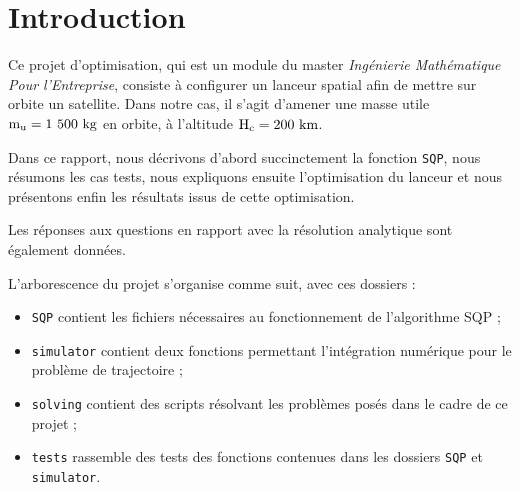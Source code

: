 \section{Introduction}

Ce projet d'optimisation, qui est un module du master \emph{Ingénierie Mathématique Pour l'Entreprise}, consiste à configurer un lanceur spatial afin de mettre sur orbite un satellite. Dans notre cas, il s'agit d'amener une masse utile $\mathrm{m}_{\mathrm{u}}=1~500~\textrm{kg}$ en orbite, à l'altitude $\mathrm{H}_{\mathrm{c}}=200~\textrm{km}$.

Dans ce rapport, nous décrivons d'abord succinctement la fonction \lstinline+SQP+, nous résumons les cas tests, nous expliquons ensuite l'optimisation du lanceur et nous présentons enfin les résultats issus de cette optimisation.

Les réponses aux questions en rapport avec la résolution analytique sont également données.

\vspace{2cm}

L'arborescence du projet s'organise comme suit, avec ces dossiers :
\vspace{1cm}
\begin{itemize}
\item\lstinline+SQP+ contient les fichiers nécessaires au fonctionnement de l'algorithme SQP ;
\item\lstinline+simulator+ contient deux fonctions permettant l'intégration numérique pour le problème de trajectoire ;
\item\lstinline+solving+ contient des scripts résolvant les problèmes posés dans le cadre de ce projet ;
\item\lstinline+tests+ rassemble des tests des fonctions contenues dans les dossiers \lstinline+SQP+ et \lstinline+simulator+.
\end{itemize}
